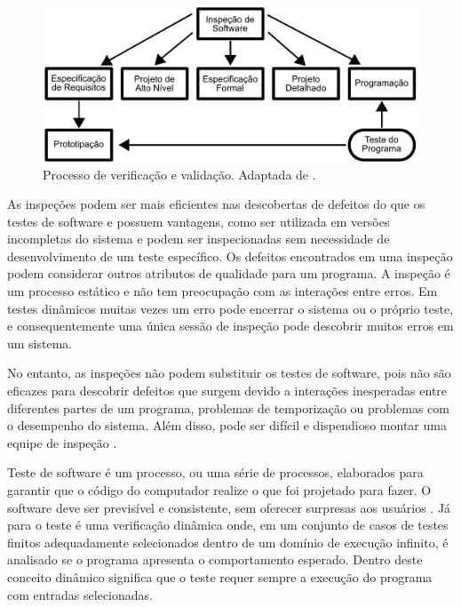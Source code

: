 \begin{figure}[ht]
\centering
\includegraphics[scale=0.7]{imagens/validacao_verificacao.pdf}
\caption{Processo de verificação e validação. Adaptada de \cite{sommerville2010}.}
\label{fig:ver&val}
\end{figure}

As inspeções podem ser mais eficientes nas descobertas de defeitos do que os testes de software e possuem vantagens, como ser utilizada em  versões incompletas do sistema e podem ser inspecionadas sem necessidade de desenvolvimento de um teste específico. Os defeitos encontrados em uma inspeção podem considerar outros atributos de qualidade para um programa. A inspeção é um processo estático e não  tem  preocupação com as interações entre erros. Em testes dinâmicos muitas vezes um erro pode encerrar o sistema ou o próprio teste, e consequentemente uma única sessão de inspeção pode descobrir muitos erros em um sistema. 

No entanto, as inspeções não podem substituir os testes de software, pois não são eficazes para descobrir defeitos que surgem devido a interações inesperadas entre diferentes partes de um programa, problemas de temporização ou problemas com o desempenho do sistema. Além disso, pode ser difícil e dispendioso montar uma equipe de inspeção \cite{sommerville2010}. 

Teste de software é um processo, ou uma série de processos, elaborados para garantir que o código do computador realize o que foi projetado para fazer. O software deve ser previsível e consistente, sem oferecer surpresas aos usuários \cite{myers2011art}. Já para \cite{bourque2014guide} o teste é uma verificação dinâmica onde, em um conjunto de casos de testes finitos adequadamente selecionados dentro de um domínio de execução infinito, é analisado se o programa apresenta o comportamento esperado. Dentro deste conceito dinâmico significa que o teste requer sempre a execução do programa com entradas selecionadas.

